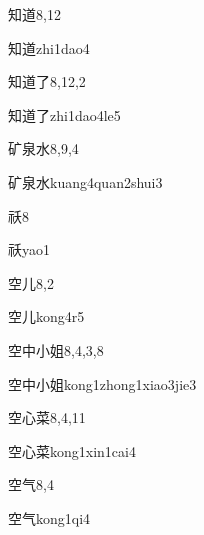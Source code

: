 \begin{entry}{知道}{8,12}
  \begin{phonetics}{知道}{zhi1dao4}
  \end{phonetics}
\end{entry}

\begin{entry}{知道了}{8,12,2}
  \begin{phonetics}{知道了}{zhi1dao4le5}
  \end{phonetics}
\end{entry}

\begin{entry}{矿泉水}{8,9,4}
  \begin{phonetics}{矿泉水}{kuang4quan2shui3}
  \end{phonetics}
\end{entry}

\begin{entry}{祅}{8}
  \begin{phonetics}{祅}{yao1}
  \end{phonetics}
\end{entry}

\begin{entry}{空儿}{8,2}
  \begin{phonetics}{空儿}{kong4r5}
  \end{phonetics}
\end{entry}

\begin{entry}{空中小姐}{8,4,3,8}
  \begin{phonetics}{空中小姐}{kong1zhong1xiao3jie3}
  \end{phonetics}
\end{entry}

\begin{entry}{空心菜}{8,4,11}
  \begin{phonetics}{空心菜}{kong1xin1cai4}
  \end{phonetics}
\end{entry}

\begin{entry}{空气}{8,4}
  \begin{phonetics}{空气}{kong1qi4}
  \end{phonetics}
\end{entry}

